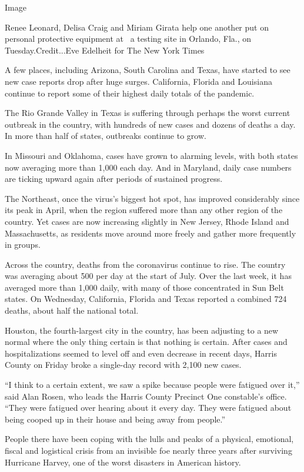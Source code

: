 Image

Renee Leonard, Delisa Craig and Miriam Girata help one another put on
personal protective equipment at~ a testing site in Orlando, Fla., on
Tuesday.Credit...Eve Edelheit for The New York Times

A few places, including Arizona, South Carolina and Texas, have started
to see new case reports drop after huge surges. California, Florida and
Louisiana continue to report some of their highest daily totals of the
pandemic.

The Rio Grande Valley in Texas is suffering through perhaps the worst
current outbreak in the country, with hundreds of new cases and dozens
of deaths a day. In more than half of states, outbreaks continue to
grow.

In Missouri and Oklahoma, cases have grown to alarming levels, with both
states now averaging more than 1,000 each day. And in Maryland, daily
case numbers are ticking upward again after periods of sustained
progress.

The Northeast, once the virus's biggest hot spot, has improved
considerably since its peak in April, when the region suffered more than
any other region of the country. Yet cases are now increasing slightly
in New Jersey, Rhode Island and Massachusetts, as residents move around
more freely and gather more frequently in groups.

Across the country, deaths from the coronavirus continue to rise. The
country was averaging about 500 per day at the start of July. Over the
last week, it has averaged more than 1,000 daily, with many of those
concentrated in Sun Belt states. On Wednesday, California, Florida and
Texas reported a combined 724 deaths, about half the national total.

Houston, the fourth-largest city in the country, has been adjusting to a
new normal where the only thing certain is that nothing is certain.
After cases and hospitalizations seemed to level off and even decrease
in recent days, Harris County on Friday broke a single-day record with
2,100 new cases.

``I think to a certain extent, we saw a spike because people were
fatigued over it,'' said Alan Rosen, who leads the Harris County
Precinct One constable's office. ``They were fatigued over hearing about
it every day. They were fatigued about being cooped up in their house
and being away from people.''

People there have been coping with the lulls and peaks of a physical,
emotional, fiscal and logistical crisis from an invisible foe nearly
three years after surviving Hurricane Harvey, one of the worst disasters
in American history.

